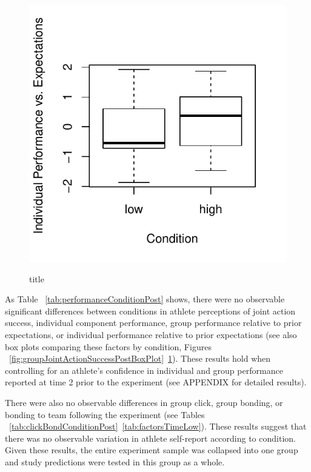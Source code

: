 \begin{figure}
  \centering
  \includegraphics{images/indPerfExpPostBoxPlot-1}
                  \label{fig:indPerfExpPostBoxPlot}
  \caption{title}
\end{figure}



As Table ~\ref{tab:performanceConditionPost} shows, there were no observable significant differences between conditions in athlete perceptions of joint action success, individual component performance, group performance relative to prior expectations, or individual performance relative to prior expectations (see also box plots comparing these factors by condition, Figures ~\ref{fig:groupJointActionSuccessPostBoxPlot}\nobreakdash~\ref{fig:indPerfExpPostBoxPlot}). These results hold when controlling for an athlete's confidence in individual and group performance reported at time 2 prior to the experiment (see APPENDIX for detailed results).

There were also no observable differences in group click, group bonding, or bonding to team following the experiment (see Tables ~\ref{tab:clickBondConditionPost}\nobreakdash~\ref{tab:factorsTimeLow}).  These results suggest that there was no observable variation in athlete self-report according to condition.  Given these results, the entire experiment sample was collapsed into one group and study predictions were tested in this group as a whole.

